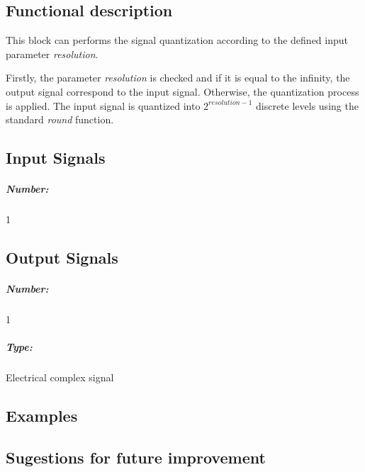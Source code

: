\subsection*{Functional description}

This block can performs the signal quantization according to the defined input parameter \textit{resolution}.

Firstly, the parameter \textit{resolution} is checked and if it is equal to the infinity, the output signal correspond to the input signal. Otherwise, the quantization process is applied. The input signal is quantized into $2^{resolution-1}$ discrete levels using the standard \textit{round} function.

\pagebreak
\subsection*{Input Signals}

\subparagraph*{Number:} 1

\subsection*{Output Signals}

\subparagraph*{Number:} 1

\subparagraph*{Type:} Electrical complex signal

\subsection*{Examples}

\subsection*{Sugestions for future improvement}


